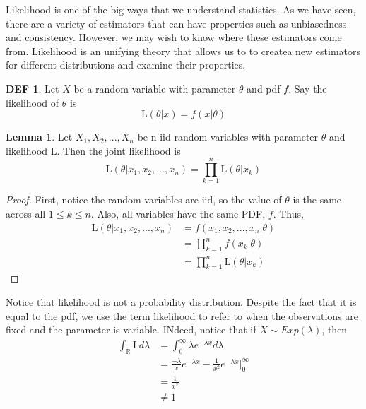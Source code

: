 \documentclass{article}
\theoremstyle{definition}\newtheorem{definition}{DEF}
\theoremstyle{definition}\newtheorem{example}{Ex}
\theoremstyle{lemma}\newtheorem{lemma}{Lemma}
\theoremstyle{corrolary}\newtheorem{corrolary}{Cor}
\begin{document}
Likelihood is one of the big ways that we understand statistics.
As we have seen, there are a variety of estimators that can have properties such as unbiasedness and consistency.
However, we may wish to know where these estimators come from.
Likelihood is an unifying theory that allows us to to createa  new estimators for different distributions and examine their properties.

\begin{definition}
Let $X$ be a random variable with parameter $\theta$ and pdf $f$.
Say the likelihood of $\theta$ is
\begin{equation}
{\mathrm L}(\theta | x) = f(x | \theta )
\end{equation}
\end{definition}

\begin{lemma}
Let $X_1, X_2, ..., X_n$ be n iid random variables with parameter $\theta$ and likelihood ${\mathrm L}$.
Then the joint likelihood is
\begin{equation}
{\mathrm L}(\theta | x_1, x_2, ..., x_n) = \prod_{k=1}^n {\mathrm L}(\theta | x_k)
\end{equation}
\end{lemma}
\begin{proof}
First, notice the random variables are iid, so the value of $\theta$ is the same across all $1 \leq k \leq n$.
Also, all variables have the same PDF, $f$.
Thus,
\begin{align*}
{\mathrm L}(\theta | x_1, x_2, ..., x_n)
&= f(x_1, x_2, ..., x_n | \theta ) \\
&= \prod_{k=1}^n f(x_k | \theta ) \\
&= \prod_{k=1}^n {\mathrm L}(\theta | x_k)
\end{align*}
\end{proof}

Notice that likelihood is not a probability distribution.
Despite the fact that it is equal to the pdf, we use the term likelihood to refer to when the observations are fixed and the parameter is variable.
INdeed, notice that if $X\sim Exp(\lambda )$, then
\begin{align*}
\int_\mathbb{R} {\mathrm L} d\lambda
&= \int_0^\infty \lambda e^{-\lambda x}d\lambda \\
&= \frac{-\lambda}{x} e^{-\lambda x} -\frac{1}{x^2} e^{-\lambda x}|_0^\infty \\
&= \frac{1}{x^2} \\
&\neq 1
\end{align*}
\end{document}
